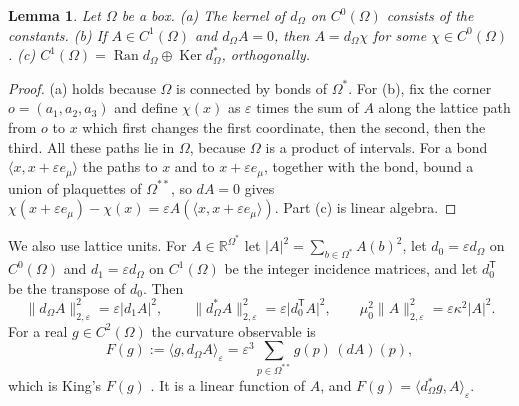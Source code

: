 \documentclass[11pt]{amsart}
\theoremstyle{plain}
\newtheorem{lemma}[theorem]{Lemma}
\theoremstyle{definition}
\theoremstyle{remark}
\numberwithin{equation}{section}
\newcommand{\R}{\mathbb{R}}
\newcommand{\eps}{\varepsilon}
\newcommand{\abs}[1]{\lvert #1\rvert}
\newcommand{\norm}[1]{\lVert #1\rVert}
\newcommand{\ip}[2]{\langle #1,#2\rangle}
\newcommand{\ev}[1]{\langle #1\rangle}
\newcommand{\Ran}{\operatorname{Ran}}
\newcommand{\Ker}{\operatorname{Ker}}
\begin{document}
\begin{lemma}\label{lem:topology}
Let $\Omega$ be a box. (a) The kernel of $d_\Omega$ on $C^0(\Omega)$ consists of the constants. (b) If $A\in C^1(\Omega)$ and $d_\Omega A=0$, then $A=d_\Omega\chi$ for some $\chi\in C^0(\Omega)$. (c) $C^1(\Omega)=\Ran d_\Omega\oplus\Ker d_\Omega^*$, orthogonally.
\end{lemma}

\begin{proof}
(a) holds because $\Omega$ is connected by bonds of $\Omega^*$. For (b), fix the corner $o=(a_1,a_2,a_3)$ and define $\chi(x)$ as $\eps$ times the sum of $A$ along the lattice path from $o$ to $x$ which first changes the first coordinate, then the second, then the third. All these paths lie in $\Omega$, because $\Omega$ is a product of intervals. For a bond $\ev{x,x+\eps e_\mu}$ the paths to $x$ and to $x+\eps e_\mu$, together with the bond, bound a union of plaquettes of $\Omega^{**}$, so $dA=0$ gives $\chi(x+\eps e_\mu)-\chi(x)=\eps A(\ev{x,x+\eps e_\mu})$. Part (c) is linear algebra.
\end{proof}

We also use lattice units. For $A\in\R^{\Omega^*}$ let $\abs A^2=\sum_{b\in\Omega^*}A(b)^2$, let $d_0=\eps d_\Omega$ on $C^0(\Omega)$ and $d_1=\eps d_\Omega$ on $C^1(\Omega)$ be the integer incidence matrices, and let $d_0^{\mathsf T}$ be the transpose of $d_0$. Then
\begin{equation}\label{eq:units}
\norm{d_\Omega A}_{2,\eps}^2=\eps\abs{d_1A}^2,\qquad\norm{d_\Omega^*A}_{2,\eps}^2=\eps\abs{d_0^{\mathsf T}A}^2,\qquad\mu_0^2\norm A_{2,\eps}^2=\eps\kappa^2\abs A^2 .
\end{equation}
For a real $g\in C^2(\Omega)$ the curvature observable is
\begin{equation}\label{eq:Fg}
F(g):=\ip{g}{d_\Omega A}_\eps=\eps^3\sum_{p\in\Omega^{**}}g(p)\,(dA)(p) ,
\end{equation}
which is King's $F(g)$ \cite[(2.12)]{K2}. It is a linear function of $A$, and $F(g)=\ip{d_\Omega^*g}{A}_\eps$.
\end{document}
